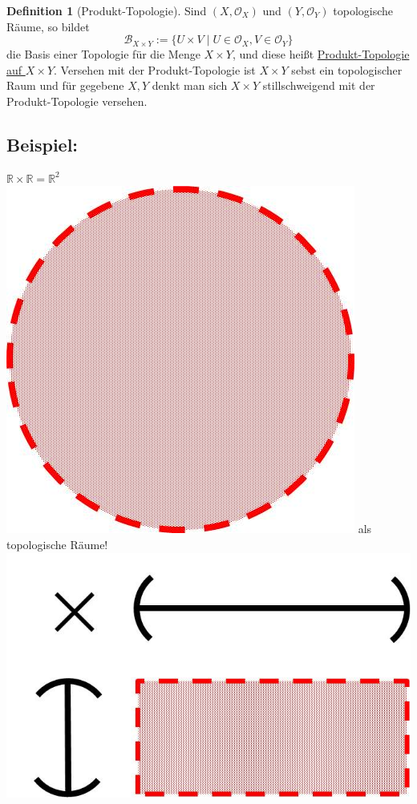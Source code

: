 \documentclass[a4paper,11pt,notitlepage]{report}
\theoremstyle{remark}
\theoremstyle{definition}
\newtheorem{definition}{Definition}[chapter]
\newcommand{\R}{{\ensuremath{\mathbb{R}}}}
\newcommand{\OO}{{\ensuremath{\mathcal{O}}}}
\newenvironment{bsp}[1]
{
\setlength{\fboxsep}{10pt}
\subsection*{Beispiel: #1}
\begin{upshape}
}
{
\end{upshape}
}
\begin{document}
\begin{definition}[Produkt-Topologie]
	Sind $(X, \OO_X)$ und $(Y, \OO_Y)$ topologische Räume, so bildet $$\mathcal{B}_{X \times Y} := \{U \times V \mid U \in \OO_X, V \in \OO_Y\}$$
	die Basis einer Topologie für die Menge $X \times Y$, und diese heißt \underline{Produkt-Topologie auf $X \times Y$}.
	\newline
	Versehen mit der Produkt-Topologie ist $X \times Y$ sebst ein topologischer Raum und für gegebene $X, Y$ denkt man sich $X \times Y$ stillschweigend mit der Produkt-Topologie versehen.
\end{definition}

\begin{bsp}{}
	$\R \times \R = \R^2$ \includegraphics[scale=0.06]{images/offener_Kreis.jpg}
	als topologische Räume!
\includegraphics[scale=0.4]{images/Produkt_RxR.jpg} 

\end{bsp}
\end{document}
